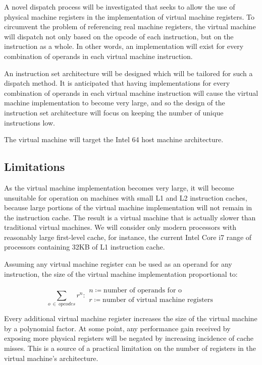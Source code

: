 		A novel dispatch process will be investigated that seeks to allow the use of physical machine registers in the implementation of virtual machine registers. To circumvent the problem of referencing real machine registers, the virtual machine will dispatch not only based on the opcode of each instruction, but on the instruction as a whole. In other words, an implementation will exist for every combination of operands in each virtual machine instruction.
	
		An instruction set architecture will be designed which will be tailored for such a dispatch method. It is anticipated that having implementations for every combination of operands in each virtual machine instruction will cause the virtual machine implementation to become very large, and so the design of the instruction set architecture will focus on keeping the number of unique instructions low.
		
		The virtual machine will target the Intel 64 host machine architecture.
		
		\subsection{Limitations}
			As the virtual machine implementation becomes very large, it will become unsuitable for operation on machines with small L1 and L2 instruction caches, because large portions of the virtual machine implementation will not remain in the instruction cache. The result is a virtual machine that is actually slower than traditional virtual machines. We will consider only modern processors with reasonably large first-level cache, for instance, the current Intel Core i7 range of processors containing 32KB of L1 instruction cache.
			
			Assuming any virtual machine register can be used as an operand for any instruction, the size of the virtual machine implementation proportional to:
			
			\[
				\sum_{o~\in~opcodes} r^n : 
					\begin{array}{l}
						n \coloneqq \text{number of operands for o} \\
						r \coloneqq \text{number of virtual machine registers}
					\end{array}
			\] 
			
			Every additional virtual machine register increases the size of the virtual machine by a polynomial factor. At some point, any performance gain received by exposing more physical registers will be negated by increasing incidence of cache misses. This is a source of a practical limitation on the number of registers in the virtual machine's architecture.
			
